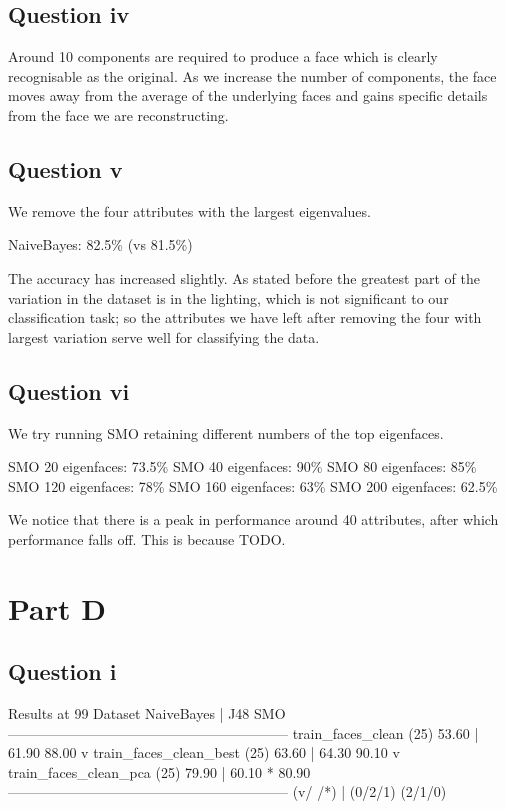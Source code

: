 \documentclass[a4paper]{article}
\begin{document}
\subsection*{Question iv}
Around 10 components are required to produce a face which is clearly recognisable as the original. As we increase the number of components, the face moves away from the average of the underlying faces and gains specific details from the face we are reconstructing.

\subsection*{Question v}
We remove the four attributes with the largest eigenvalues.

NaiveBayes: 82.5\% (vs 81.5\%)

The accuracy has increased slightly. As stated before the greatest part of the variation in the dataset is in the lighting, which is not significant to our classification task; so the attributes we have left after removing the four with largest variation serve well for classifying the data.

\subsection*{Question vi}
We try running SMO retaining different numbers of the top eigenfaces.

SMO 20 eigenfaces: 73.5\%
SMO 40 eigenfaces: 90\%
SMO 80 eigenfaces: 85\%
SMO 120 eigenfaces: 78\%
SMO 160 eigenfaces: 63\%
SMO 200 eigenfaces: 62.5\%

We notice that there is a peak in performance around 40 attributes, after which performance falls off. This is because TODO.

\section*{Part D}
\subsection*{Question i}

Results at 99%
Dataset                       NaiveBayes |     J48     SMO
------------------------------------------------------------
train_faces_clean           (25)   53.60 |   61.90     88.00 v
train_faces_clean_best      (25)   63.60 |   64.30     90.10 v
train_faces_clean_pca       (25)   79.90 |   60.10 *   80.90  
------------------------------------------------------------
                                 (v/ /*) |   (0/2/1)   (2/1/0)
\end{document}
